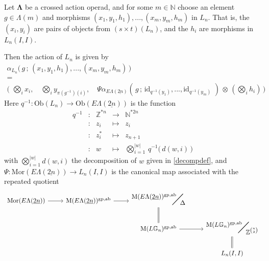 \documentclass{amsbook} %
\newcommand{\ML}{\mathbf{\Lambda}}
\newcommand{\bigquotient}[2]{ \raisebox{0.75\height}{$#1$} \mkern-12mu\scalebox{2}{$\diagup$}\mkern-10mu \raisebox{-0.5\height}{$#2$} }
\newcommand{\ELnn}{E\Lambda(\underline{2n})}
\numberwithin{section}{chapter}
\begin{document}
\begin{prop} \label{crossact} Let $\ML$ be a crossed action operad, and for some $m \in \mathbb{N}$ choose an element $g \in \Lambda(m)$ and morphisms $(x_1, y_1, h_1), ..., (x_m, y_m, h_m)$ in $L_n$. That is, the $(x_i, y_i)$ are pairs of objects from $(s \times t)(L_n)$, and the $h_i$ are morphisms in $L_n(I,I)$. 


Then the action of $L_n$ is given by
\[ \begin{array}{c}
			\alpha_{L_n}\big( \, g \, ; \, (x_1, y_1, h_1), ..., (x_m, y_m, h_m) \, \big) \\
			= \\
			\big( \, \, \bigotimes_i x_i, \quad \bigotimes_i y_{\pi(g^{-1})(i)}, \quad \Psi \alpha_{\ELnn}( \, g \, ; \, \mathrm{id}_{q^{-1}(y_1)}, ..., \mathrm{id}_{q^{-1}(y_m)} \, \, ) \, \otimes \, (\bigotimes_i h_i) \, \big) 
		\end{array}
\]
Here $q^{-1}: \mathrm{Ob}(L_n) \to \mathrm{Ob}(\ELnn)$ is the function 
\[ \begin{array}{rcrcl}
			q^{-1} & : & \mathbb{Z}^{\ast n} & \to & \mathbb{N}^{\ast 2n} \\
			& : & z_i & \mapsto & z_i \\
			& : & z_i^* & \mapsto & z_{n+1} \\
			& : & w & \mapsto & \bigotimes_{i=1}^{|w|} \, q^{-1}\big( \, d(w, i) \, \big)
		\end{array}
\]
with $\bigotimes_{i=1}^{|w|} d(w, i)$ the decomposition of $w$ given in \cref{decompdef}, and $\Psi: \mathrm{Mor}(\ELnn) \to L_n(I,I)$ is the canonical map associated with the repeated quotient
\[ \begin{tikzcd}
\mathrm{Mor}(\ELnn) \ar[r] & \mathrm{M}(\ELnn)^{\mathrm{gp}, \mathrm{ab}} \ar[r] & \bigquotient{\mathrm{M}(\ELnn)^{\mathrm{gp}, \mathrm{ab}}}{\Delta} \ar[d, equals] & \\
& & \mathrm{M}(L\mathbb{G}_{n})^{\mathrm{gp}, \mathrm{ab}} \ar[r] & \bigquotient{\mathrm{M}(L\mathbb{G}_{n})^{\mathrm{gp}, \mathrm{ab}}}{\mathbb{Z}^{{n}\choose{2}}} \ar[d, equals] \\
& & & L_n(I,I)
\end{tikzcd} \]
\end{prop} 
\end{document}
